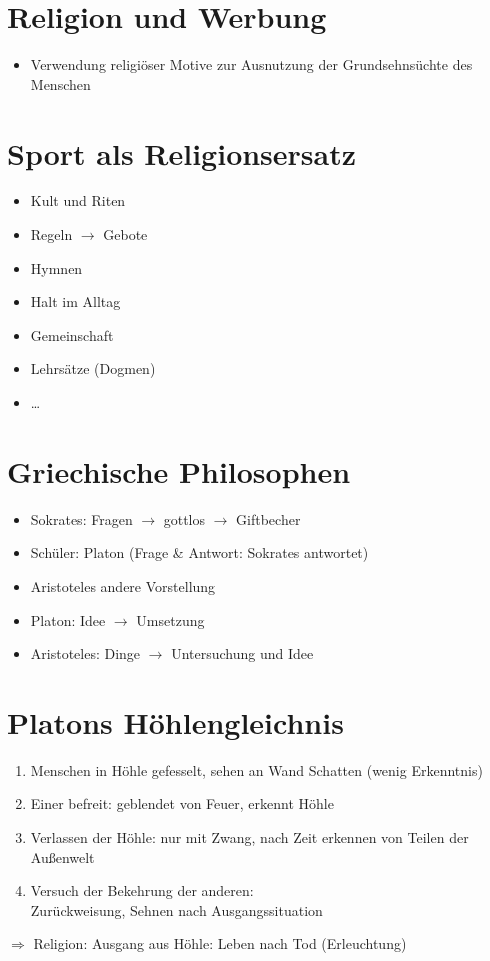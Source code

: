 \documentclass[11pt, paper=a4, twocolumn]{scrartcl}
\begin{document}
	\section{Religion und Werbung}
	
	\begin{itemize}
		\item Verwendung religiöser Motive zur Ausnutzung der Grundsehnsüchte des Menschen
	\end{itemize}

	\section{Sport als Religionsersatz}

	\begin{itemize}
		\item Kult und Riten
		\item Regeln $\rightarrow$ Gebote
		\item Hymnen
		\item Halt im Alltag
		\item Gemeinschaft
		\item Lehrsätze (Dogmen)
		\item \dots
	\end{itemize}

	\section{Griechische Philosophen}

	\begin{itemize}
		\item Sokrates: Fragen $\rightarrow$ \glqq{}gottlos\grqq{} $\rightarrow$ Giftbecher
		\item Schüler: Platon (Frage \& Antwort: \glqq{}Sokrates\grqq{} antwortet)
		\item Aristoteles andere Vorstellung
		\item Platon: \glqq{}Idee\grqq{} $\rightarrow$ Umsetzung
		\item Aristoteles: Dinge $\rightarrow$ Untersuchung und \glqq{}Idee\grqq{}
	\end{itemize}

	\section{Platons Höhlengleichnis}

	\begin{enumerate}
		\item Menschen in Höhle gefesselt, sehen an Wand Schatten (wenig Erkenntnis)
		\item Einer befreit: geblendet von Feuer, erkennt Höhle
		\item Verlassen der Höhle: nur mit Zwang, nach Zeit erkennen von Teilen der Außenwelt
		\item Versuch der \glqq{}Bekehrung\grqq{} der anderen:\\
			Zurückweisung, Sehnen nach Ausgangssituation
	\end{enumerate}
	$\Rightarrow$ Religion: Ausgang aus Höhle: Leben nach Tod (Erleuchtung)
\end{document}
